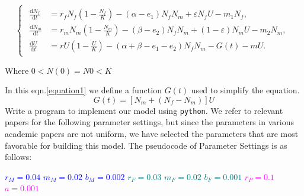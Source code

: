 \documentclass{mcmthesis}
\begin{document}
\begin{equation}
  \label{equation1}
  \begin{cases}
    \begin{aligned}
      \frac{\mathrm{d} N_{f}}{\mathrm{d} t} & = r_{f} N_{f} \left(1 - \frac{N_{f}}{K} \right) - (\alpha - e_{1}) N_{f} N_{m} + \varepsilon N_{f} U - m_{1} N_{f},      \\
      \frac{\mathrm{d} N_{m}}{\mathrm{d} t} & = r_{m} N_{m} \left(1 - \frac{N_{m}}{K} \right) - (\beta - e_{2}) N_{f} N_{m} + (1 - \varepsilon) N_{m} U - m_{2} N_{m}, \\
      \frac{\mathrm{d} U}{\mathrm{d} t}     & = r U \left(1 - \frac{U}{K} \right) - (\alpha + \beta - e_{1} - e_{2}) N_{f} N_{m} - G(t) - m U.
    \end{aligned}
  \end{cases}
\end{equation}

Where $0<N(0)=N0<K$

In this eqn.\ref{equation1} we define a function $G(t)$ used to simplify the equation.
\begin{equation}
  G(t)=[N_{m}+(N_{f} -N_{m})]U
\end{equation}
Write a program to implement our model using \texttt{python}.
We refer to relevant papers for the following parameter settings,
but since the parameters in various academic papers are not uniform,
we have selected the parameters that are most favorable for building this model.
The pseudocode of Parameter Settings is as follows:

\begin{algorithm}[H]
  \caption{Parameter Settings}
  \begin{algorithmic}
    \State \textcolor{blue}{$r_M = 0.04$} 
    \State \textcolor{blue}{$m_M = 0.02$} 
    \State \textcolor{blue}{$b_M = 0.002$} 
    \State \textcolor{teal}{$r_F = 0.03$} 
    \State \textcolor{teal}{$m_F = 0.02$} 
    \State \textcolor{teal}{$b_F = 0.001$} 
    \State \textcolor{magenta}{$r_P = 0.1$} 
    \State \textcolor{magenta}{$a = 0.001$} 
  \end{algorithmic}
\end{algorithm}
\end{document}
